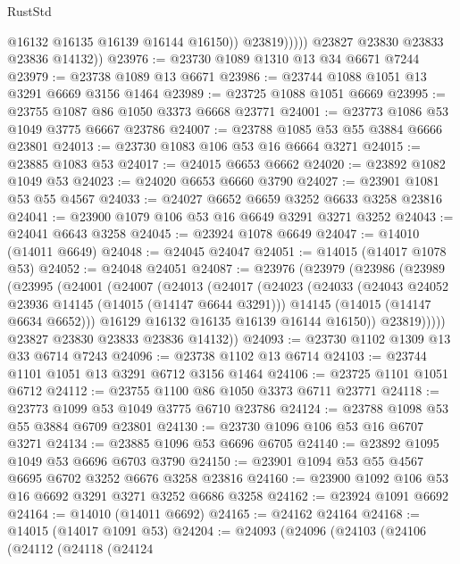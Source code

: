 \begin{lexlean}{RustStd}
\begin{coremodule}
                      @16132
                      @16135
                      @16139
                      @16144
                      @16150))
                  @23819)))))
        @23827
        @23830
        @23833
        @23836
        @14132))
@23976 := @23730 @1089 @1310 @13 @34 @6671 @7244
@23979 := @23738 @1089 @13 @6671
@23986 := @23744 @1088 @1051 @13 @3291 @6669 @3156 @1464
@23989 := @23725 @1088 @1051 @6669
@23995 := @23755 @1087 @86 @1050 @3373 @6668 @23771
@24001 := @23773 @1086 @53 @1049 @3775 @6667 @23786
@24007 := @23788 @1085 @53 @55 @3884 @6666 @23801
@24013 := @23730 @1083 @106 @53 @16 @6664 @3271
@24015 := @23885 @1083 @53
@24017 := @24015 @6653 @6662
@24020 := @23892 @1082 @1049 @53
@24023 := @24020 @6653 @6660 @3790
@24027 := @23901 @1081 @53 @55 @4567
@24033 := @24027 @6652 @6659 @3252 @6633 @3258 @23816
@24041 := @23900 @1079 @106 @53 @16 @6649 @3291 @3271 @3252
@24043 := @24041 @6643 @3258
@24045 := @23924 @1078 @6649
@24047 := @14010 (@14011 @6649)
@24048 := @24045 @24047
@24051 := @14015 (@14017 @1078 @53)
@24052 := @24048 @24051
@24087 := @23976
    (@23979
      (@23986
        (@23989
          (@23995
            (@24001
              (@24007
                (@24013
                  (@24017
                    (@24023
                      (@24033
                        (@24043 @24052 @23936 @14145 (@14015 (@14147 @6644 @3291)))
                        @14145
                        (@14015 (@14147 @6634 @6652)))
                      @16129
                      @16132
                      @16135
                      @16139
                      @16144
                      @16150))
                  @23819)))))
        @23827
        @23830
        @23833
        @23836
        @14132))
@24093 := @23730 @1102 @1309 @13 @33 @6714 @7243
@24096 := @23738 @1102 @13 @6714
@24103 := @23744 @1101 @1051 @13 @3291 @6712 @3156 @1464
@24106 := @23725 @1101 @1051 @6712
@24112 := @23755 @1100 @86 @1050 @3373 @6711 @23771
@24118 := @23773 @1099 @53 @1049 @3775 @6710 @23786
@24124 := @23788 @1098 @53 @55 @3884 @6709 @23801
@24130 := @23730 @1096 @106 @53 @16 @6707 @3271
@24134 := @23885 @1096 @53 @6696 @6705
@24140 := @23892 @1095 @1049 @53 @6696 @6703 @3790
@24150 := @23901 @1094 @53 @55 @4567 @6695 @6702 @3252 @6676 @3258 @23816
@24160 := @23900 @1092 @106 @53 @16 @6692 @3291 @3271 @3252 @6686 @3258
@24162 := @23924 @1091 @6692
@24164 := @14010 (@14011 @6692)
@24165 := @24162 @24164
@24168 := @14015 (@14017 @1091 @53)
@24204 := @24093
    (@24096
      (@24103
        (@24106
          (@24112
            (@24118
              (@24124

\end{coremodule}
\end{lexlean}
